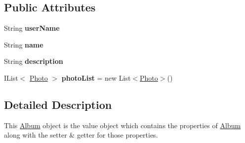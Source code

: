 \subsection*{Public Attributes}
\begin{DoxyCompactItemize}
\item 
\hypertarget{classcom_1_1shephertz_1_1app42_1_1paas_1_1sdk_1_1csharp_1_1gallery_1_1_album_a7a041b3b7a7caf41607ad6b7bdd780b9}{String {\bfseries user\+Name}}\label{classcom_1_1shephertz_1_1app42_1_1paas_1_1sdk_1_1csharp_1_1gallery_1_1_album_a7a041b3b7a7caf41607ad6b7bdd780b9}

\item 
\hypertarget{classcom_1_1shephertz_1_1app42_1_1paas_1_1sdk_1_1csharp_1_1gallery_1_1_album_ad1bca9e404083043394d1be6062081a2}{String {\bfseries name}}\label{classcom_1_1shephertz_1_1app42_1_1paas_1_1sdk_1_1csharp_1_1gallery_1_1_album_ad1bca9e404083043394d1be6062081a2}

\item 
\hypertarget{classcom_1_1shephertz_1_1app42_1_1paas_1_1sdk_1_1csharp_1_1gallery_1_1_album_a909e2d1f268143f99f29b25ff3108bc1}{String {\bfseries description}}\label{classcom_1_1shephertz_1_1app42_1_1paas_1_1sdk_1_1csharp_1_1gallery_1_1_album_a909e2d1f268143f99f29b25ff3108bc1}

\item 
\hypertarget{classcom_1_1shephertz_1_1app42_1_1paas_1_1sdk_1_1csharp_1_1gallery_1_1_album_aadfb7f54c7799493ac2c637215e5a985}{I\+List$<$ \hyperlink{classcom_1_1shephertz_1_1app42_1_1paas_1_1sdk_1_1csharp_1_1gallery_1_1_album_1_1_photo}{Photo} $>$ {\bfseries photo\+List} = new List$<$\hyperlink{classcom_1_1shephertz_1_1app42_1_1paas_1_1sdk_1_1csharp_1_1gallery_1_1_album_1_1_photo}{Photo}$>$()}\label{classcom_1_1shephertz_1_1app42_1_1paas_1_1sdk_1_1csharp_1_1gallery_1_1_album_aadfb7f54c7799493ac2c637215e5a985}

\end{DoxyCompactItemize}


\subsection{Detailed Description}
This \hyperlink{classcom_1_1shephertz_1_1app42_1_1paas_1_1sdk_1_1csharp_1_1gallery_1_1_album}{Album} object is the value object which contains the properties of \hyperlink{classcom_1_1shephertz_1_1app42_1_1paas_1_1sdk_1_1csharp_1_1gallery_1_1_album}{Album} along with the setter \& getter for those properties. 



